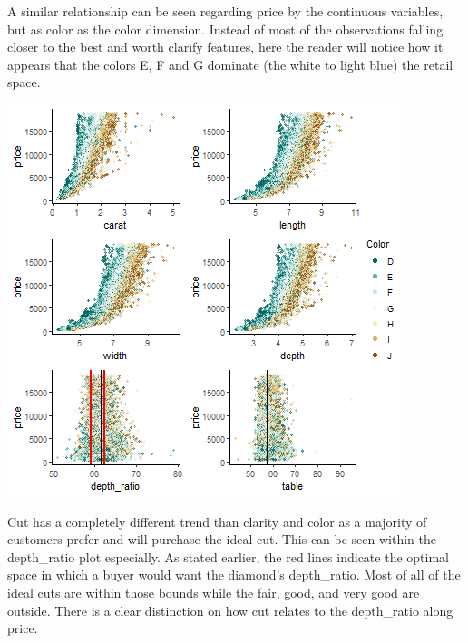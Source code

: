 \documentclass[
  paper=a4,
  ,captions=tableheading
]{scrartcl}
\begin{document}
A similar relationship can be seen regarding price by the continuous
variables, but as color as the color dimension. Instead of most of the
observations falling closer to the best and worth clarify features, here
the reader will notice how it appears that the colors E, F and G
dominate (the white to light blue) the retail space.

\begin{center}\includegraphics{Diamonds_PDF_files/figure-latex/Price by X and Color-1} \end{center}

Cut has a completely different trend than clarity and color as a
majority of customers prefer and will purchase the ideal cut. This can
be seen within the depth\_ratio plot especially. As stated earlier, the
red lines indicate the optimal space in which a buyer would want the
diamond's depth\_ratio. Most of all of the ideal cuts are within those
bounds while the fair, good, and very good are outside. There is a clear
distinction on how cut relates to the depth\_ratio along price.
\end{document}
